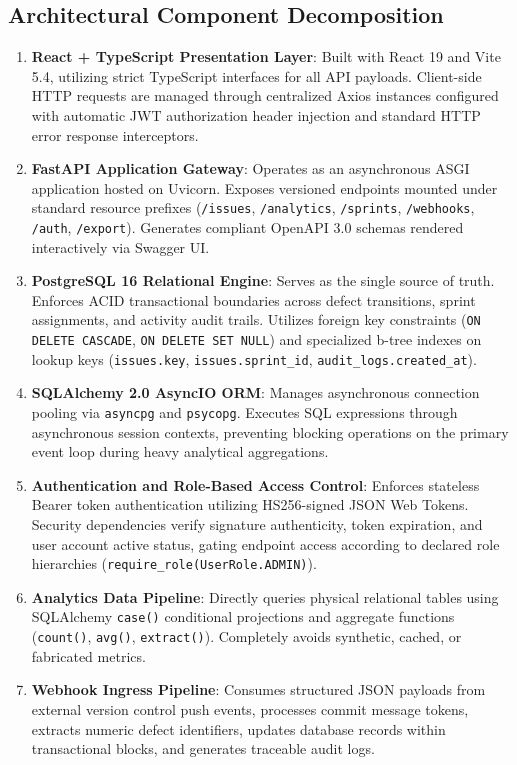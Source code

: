 \documentclass[11pt,a4paper]{article}
\begin{document}
\subsection{Architectural Component Decomposition}
\begin{enumerate}
    \item \textbf{React + TypeScript Presentation Layer}: Built with React 19 and Vite 5.4, utilizing strict TypeScript interfaces for all API payloads. Client-side HTTP requests are managed through centralized Axios instances configured with automatic JWT authorization header injection and standard HTTP error response interceptors.
    \item \textbf{FastAPI Application Gateway}: Operates as an asynchronous ASGI application hosted on Uvicorn. Exposes versioned endpoints mounted under standard resource prefixes (\texttt{/issues}, \texttt{/analytics}, \texttt{/sprints}, \texttt{/webhooks}, \texttt{/auth}, \texttt{/export}). Generates compliant OpenAPI 3.0 schemas rendered interactively via Swagger UI.
    \item \textbf{PostgreSQL 16 Relational Engine}: Serves as the single source of truth. Enforces ACID transactional boundaries across defect transitions, sprint assignments, and activity audit trails. Utilizes foreign key constraints (\texttt{ON DELETE CASCADE}, \texttt{ON DELETE SET NULL}) and specialized b-tree indexes on lookup keys (\texttt{issues.key}, \texttt{issues.sprint\_id}, \texttt{audit\_logs.created\_at}).
    \item \textbf{SQLAlchemy 2.0 AsyncIO ORM}: Manages asynchronous connection pooling via \texttt{asyncpg} and \texttt{psycopg}. Executes SQL expressions through asynchronous session contexts, preventing blocking operations on the primary event loop during heavy analytical aggregations.
    \item \textbf{Authentication and Role-Based Access Control}: Enforces stateless Bearer token authentication utilizing HS256-signed JSON Web Tokens. Security dependencies verify signature authenticity, token expiration, and user account active status, gating endpoint access according to declared role hierarchies (\texttt{require\_role(UserRole.ADMIN)}).
    \item \textbf{Analytics Data Pipeline}: Directly queries physical relational tables using SQLAlchemy \texttt{case()} conditional projections and aggregate functions (\texttt{count()}, \texttt{avg()}, \texttt{extract()}). Completely avoids synthetic, cached, or fabricated metrics.
    \item \textbf{Webhook Ingress Pipeline}: Consumes structured JSON payloads from external version control push events, processes commit message tokens, extracts numeric defect identifiers, updates database records within transactional blocks, and generates traceable audit logs.
\end{enumerate}
\end{document}
